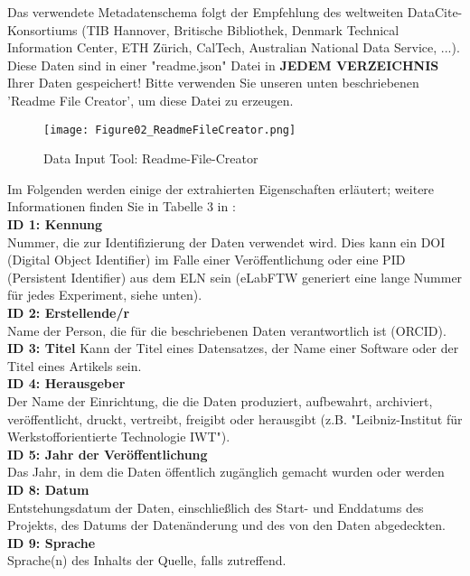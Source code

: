 Das verwendete Metadatenschema folgt der Empfehlung des weltweiten
DataCite-Konsortiums (TIB Hannover, Britische Bibliothek, Denmark Technical
Information Center, ETH Zürich, CalTech, Australian National Data Service, ...).
Diese Daten sind in einer "readme.json" Datei in \textbf{JEDEM VERZEICHNIS}
Ihrer Daten gespeichert! Bitte verwenden Sie unseren unten beschriebenen
'Readme File Creator', um diese Datei zu erzeugen. \\
\begin{wrapfigure}{r}{0.5\linewidth}
  \vspace{-1em}
  \texttt{[image: Figure02\_ReadmeFileCreator.png]}
  \caption{Data Input Tool: Readme-File-Creator}
  \label{fig:readme-creator}
\end{wrapfigure}
Im Folgenden werden einige der extrahierten Eigenschaften erläutert; weitere
Informationen finden Sie in Tabelle 3 in \cite{datacite2019}: \\[6pt]
%
\textbf{ID 1: Kennung} \\
Nummer, die zur Identifizierung der Daten verwendet wird. Dies kann ein DOI
(Digital Object Identifier) im Falle einer Veröffentlichung oder eine PID
(Persistent Identifier) aus dem ELN sein (eLabFTW  generiert eine lange Nummer
für jedes Experiment, siehe unten). \\[6pt]
%
\textbf{ID 2: Erstellende/r} \\
Name der Person, die für die beschriebenen Daten verantwortlich ist (ORCID). \\[6pt]
%
\textbf{ID 3: Titel}
Kann der Titel eines Datensatzes, der Name einer Software oder der Titel eines
Artikels sein. \\[6pt]
%
\textbf{ID 4: Herausgeber} \\
Der Name der Einrichtung, die die Daten produziert, aufbewahrt, archiviert,
veröffentlicht, druckt, vertreibt, freigibt oder herausgibt (z.B.
"Leibniz-Institut für Werkstofforientierte Technologie IWT"). \\[6pt]
%
\textbf{ID 5: Jahr der Veröffentlichung} \\
Das Jahr, in dem die Daten öffentlich zugänglich gemacht wurden oder werden \\[6pt]
%
\textbf{ID 8: Datum} \\
Entstehungsdatum der Daten, einschließlich des Start- und Enddatums des
Projekts, des Datums der Datenänderung und des von den Daten abgedeckten. \\[6pt]
%
\textbf{ID 9: Sprache} \\
Sprache(n) des Inhalts der Quelle, falls zutreffend. \\[6pt]
